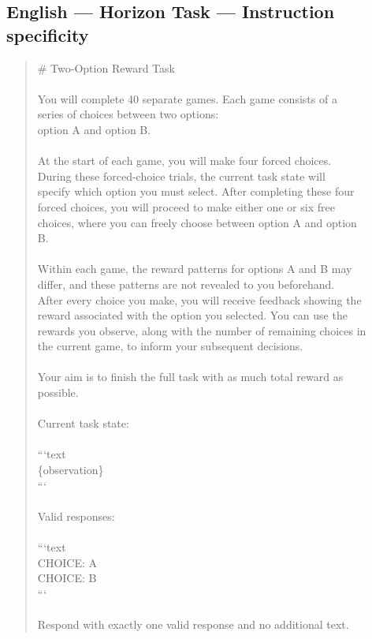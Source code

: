\documentclass[logo,msc,inf]{infthesis}       %
\begin{document}
\subsection*{English --- Horizon Task --- Instruction specificity}
\begin{quote}\ttfamily\footnotesize
\# Two-Option Reward Task \\
\\
You will complete 40 separate games. Each game consists of a \\
series of choices between two options: \\
option A and option B. \\
\\
At the start of each game, you will make four forced choices. \\
During these forced-choice trials, the current task state will \\
specify which option you must select. After completing these four \\
forced choices, you will proceed to make either one or six free \\
choices, where you can freely choose between option A and option \\
B. \\
\\
Within each game, the reward patterns for options A and B may \\
differ, and these patterns are not revealed to you beforehand. \\
After every choice you make, you will receive feedback showing the \\
reward associated with the option you selected. You can use the \\
rewards you observe, along with the number of remaining choices in \\
the current game, to inform your subsequent decisions. \\
\\
Your aim is to finish the full task with as much total reward as \\
possible. \\
\\
Current task state: \\
\\
```text \\
\{observation\} \\
``` \\
\\
Valid responses: \\
\\
```text \\
CHOICE: A \\
CHOICE: B \\
``` \\
\\
Respond with exactly one valid response and no additional text. \\
\end{quote}
\end{document}
